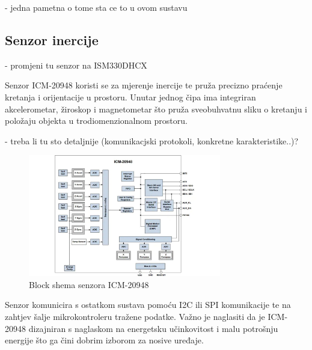 \documentclass[../diplomski_rad.tex]{subfiles}
\begin{document}
- jedna pametna o tome sta ce to u ovom sustavu


\subsection{Senzor inercije}

- promjeni tu senzor na ISM330DHCX

Senzor ICM-20948 koristi se za mjerenje inercije te pruža precizno praćenje kretanja i orijentacije u prostoru.
Unutar jednog čipa ima integriran akcelerometar, žiroskop i magnetometar što pruža sveobuhvatnu sliku o kretanju 
i položaju objekta u trodiomenzionalnom prostoru. 

- treba li tu sto detaljnije (komunikacjski protokoli, konkretne karakteristike..)?

\begin{figure}[htb]
    \centering
    \includegraphics[width=0.75\textwidth]{Figures/ICM-20948.jpg} 
    \caption{Block shema senzora ICM-20948 \cite{icm20948}}
    \label{slk:icm20948}
\end{figure}

Senzor komunicira s ostatkom sustava pomoću I2C ili SPI komunikacije te na zahtjev šalje mikrokontroleru tražene podatke.
Važno je naglasiti da je ICM-20948 dizajniran s naglaskom na energetsku učinkovitost i malu potrošnju energije 
što ga čini dobrim izborom za nosive uređaje.
\end{document}

